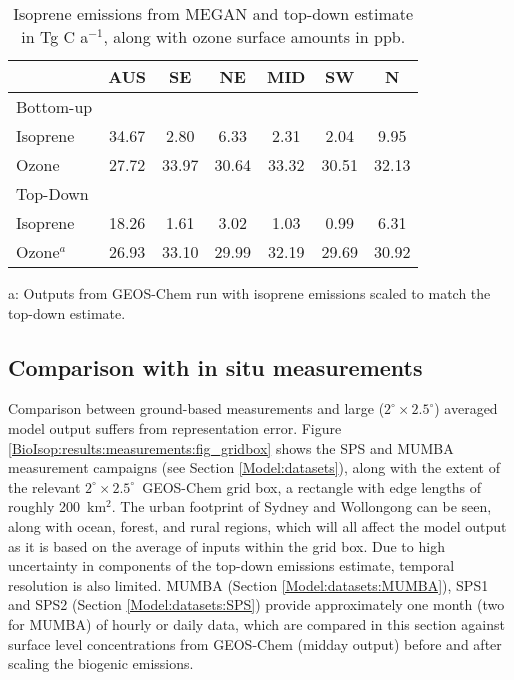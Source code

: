 \documentclass[acp, manuscript]{copernicus}
\newcommand{\lowhr}{$2^{\circ} \times 2.5^{\circ}$}
\begin{document}
      \begin{table}\begin{threeparttable}
        \caption{Isoprene emissions from MEGAN and top-down estimate in Tg C a$^{-1}$, along with ozone surface amounts in ppb.}
        \begin{tabular}{ l c c c c c c } 
          \toprule
          & AUS & SE & NE & MID & SW & N \\
          \midrule
          Bottom-up      & & & & & & \\
          Isoprene       & 34.67 &  2.80 &  6.33 &  2.31 &  2.04 &  9.95 \\
          Ozone          & 27.72 & 33.97 & 30.64 & 33.32 & 30.51 & 32.13 \\
          \midrule
          Top-Down       & & & & & & \\
          Isoprene       & 18.26 &  1.61 &  3.02 &  1.03 &  0.99 &  6.31 \\
          Ozone$^a$      & 26.93 & 33.10 & 29.99 & 32.19 & 29.69 & 30.92 \\
          \bottomrule
        \end{tabular}
        \begin{tablenotes}
          \small
          \item a: Outputs from GEOS-Chem run with isoprene emissions scaled to match the top-down estimate.
        \end{tablenotes}
        \label{BioIsop:results:new_emiss:tab_emissions_vs_ozone}
      \end{threeparttable}\end{table}

  
  \subsection{Comparison with in situ measurements}
    \label{BioIsop:results:measurements}
    
    Comparison between ground-based measurements and large (\lowhr) averaged model output suffers from representation error.
    Figure \ref{BioIsop:results:measurements:fig_gridbox} shows the SPS and MUMBA measurement campaigns (see Section \ref{Model:datasets}), along with the extent of the relevant \lowhr ~GEOS-Chem grid box, a rectangle with edge lengths of roughly 200~km$^{2}$.
    The urban footprint of Sydney and Wollongong can be seen, along with ocean, forest, and rural regions, which will all affect the model output as it is based on the average of inputs within the grid box.
    Due to high uncertainty in components of the top-down emissions estimate, temporal resolution is also limited.
    MUMBA (Section \ref{Model:datasets:MUMBA}), SPS1 and SPS2 (Section \ref{Model:datasets:SPS}) provide approximately one month (two for MUMBA) of hourly or daily data, which are compared in this section against surface level concentrations from GEOS-Chem (midday output) before and after scaling the biogenic emissions.
    
\end{document}
